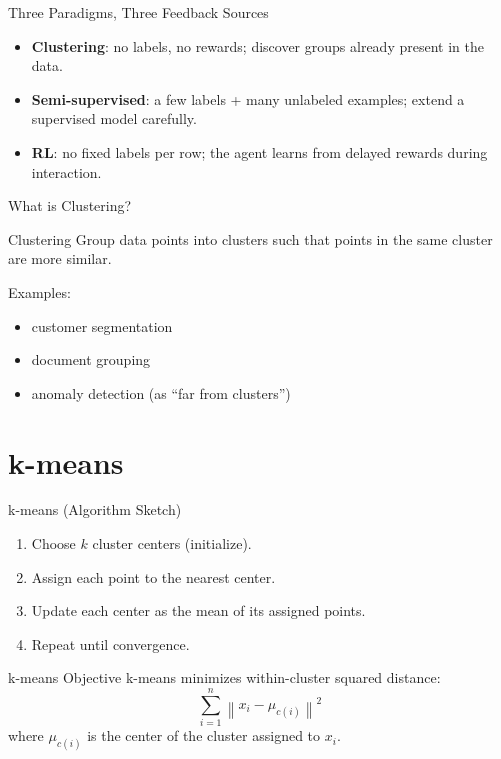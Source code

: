\documentclass[aspectratio=169]{beamer}
\begin{document}
\begin{frame}{Three Paradigms, Three Feedback Sources}
  \begin{itemize}[<+->]
    \item \textbf{Clustering}: no labels, no rewards; discover groups already present in the data.
    \item \textbf{Semi-supervised}: a few labels + many unlabeled examples; extend a supervised model carefully.
    \item \textbf{RL}: no fixed labels per row; the agent learns from delayed rewards during interaction.
  \end{itemize}
\end{frame}

\begin{frame}{What is Clustering?}
  \begin{block}{Clustering}
    Group data points into clusters such that points in the same cluster are more similar.
  \end{block}
  \vspace{0.4em}
  Examples:
  \begin{itemize}[<+->]
    \item customer segmentation
    \item document grouping
    \item anomaly detection (as ``far from clusters'')
  \end{itemize}
\end{frame}

\section{k-means}
\label{sec:kmeans}

\begin{frame}{k-means (Algorithm Sketch)}
  \begin{enumerate}[<+->]
    \item Choose $k$ cluster centers (initialize).
    \item Assign each point to the nearest center.
    \item Update each center as the mean of its assigned points.
    \item Repeat until convergence.
  \end{enumerate}
\end{frame}

\begin{frame}{k-means Objective}
  k-means minimizes within-cluster squared distance:
  \[
    \sum_{i=1}^{n}\left\|x_i - \mu_{c(i)}\right\|^2
  \]
  where $\mu_{c(i)}$ is the center of the cluster assigned to $x_i$.
\end{frame}
\end{document}
